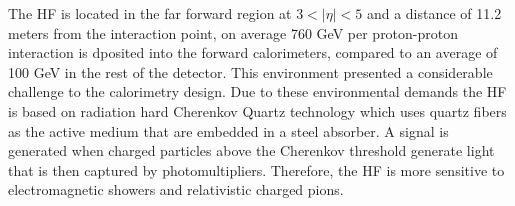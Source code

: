 The HF is located in the far forward region at $3<|\eta|<5$ and a distance
of  11.2 meters from the interaction point, on average 760 GeV per 
proton-proton interaction is dposited into the forward calorimeters, compared
to an average of 100 GeV in the rest of the detector. This environment
presented a considerable challenge to the calorimetry design. Due to these 
environmental demands the HF is based on radiation hard Cherenkov Quartz technology
which uses quartz fibers as the active medium that are embedded in a steel absorber. 
A signal is generated when charged particles above the Cherenkov threshold
generate light that is then captured by photomultipliers. Therefore, the HF is
more sensitive to electromagnetic showers and relativistic charged pions.



